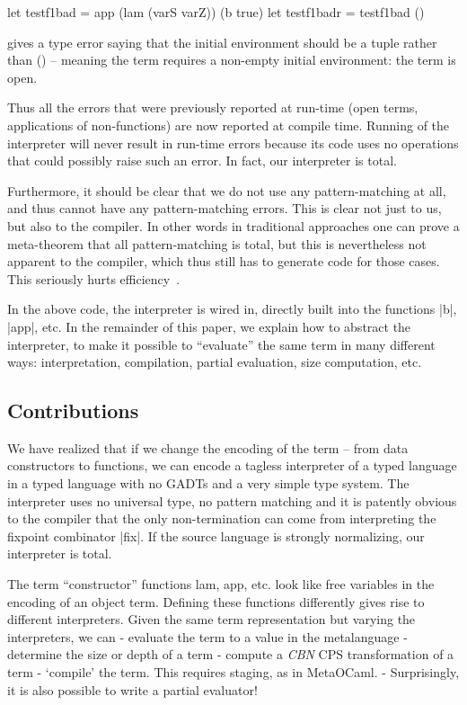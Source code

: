 \documentclass[preprint]{sigplanconf}
\let\cite=\citep
\begin{document}
\begin{code}
  let testf1bad = app (lam (varS varZ)) (b true)
  let testf1badr = testf1bad ()
\end{code}
gives a type error saying 
that the initial environment should be a tuple rather than () --
meaning the term requires a non-empty initial environment: the term is
open.

Thus all the errors that were previously reported at run-time (open terms,
applications of non-functions) are now reported at compile
time. Running of the interpreter will never result in run-time errors
because its code uses no operations that could possibly raise such
an error. In fact, our interpreter is total.

Furthermore, it should be clear that we do not use any
pattern-matching at all, and thus cannot have any pattern-matching
errors.  This is clear not just to us, but also to the compiler.
In other words in traditional approaches one can prove a meta-theorem
that all pattern-matching is total, but this is nevertheless not
apparent to the compiler, which thus still has to generate code for
those cases.  This seriously hurts efficiency~\cite{WalidICFP02}.

In the above code, the interpreter is wired in, directly built into the
functions |b|, |app|, etc.  In the remainder of this paper, 
we explain how to abstract the interpreter,
to make it possible to ``evaluate'' the same term in many different
ways: interpretation, compilation, partial evaluation, size
computation, etc.

\subsection{Contributions}\label{contributions}

   We have realized that if we change the encoding of the term --
from data constructors to functions, we can encode a tagless
interpreter of a typed language in a typed language with no GADTs and
a very simple type system. The interpreter uses no universal type, no
pattern matching and it is patently obvious to the compiler that the
only non-termination can come from interpreting the fixpoint
combinator |fix|. If the source
language is strongly normalizing, our interpreter is total.

The term ``constructor'' functions lam, app, etc. look like free
variables in the encoding of an object term.  Defining these functions
differently gives rise to different interpreters.  Given the same term
representation but varying the interpreters, we can
	- evaluate the term to a value in the metalanguage
	- determine the size or depth of a term
    - compute a \emph{CBN} CPS transformation of a term
	- `compile' the term. This requires staging, as in MetaOCaml.
	- Surprisingly, it is also possible to write a partial evaluator! 
\end{document}
